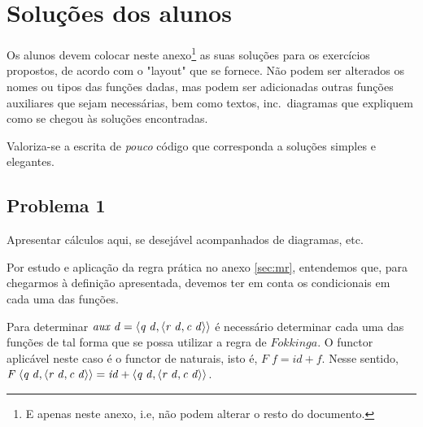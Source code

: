 \documentclass[a4paper]{article}
\newcommand{\Conid}[1]{\mathit{#1}}
\newcommand{\Varid}[1]{\mathit{#1}}
\begin{document}
\section{Soluções dos alunos}\label{sec:resolucao}

Os alunos devem colocar neste anexo\footnote{E apenas neste anexo,
i.e, não podem alterar o resto do documento.} as suas soluções para os
exercícios propostos, de acordo com o "layout" que se fornece. Não podem
ser alterados os nomes ou tipos das funções dadas, mas podem ser adicionadas
outras funções auxiliares que sejam necessárias, bem como 
textos, inc.\ diagramas que expliquem como se chegou às soluções encontradas.

Valoriza-se a escrita de \emph{pouco} código que corresponda a soluções
simples e elegantes.

\subsection*{Problema 1} \label{pg:P1}

Apresentar cálculos aqui, se desejável acompanhados de diagramas, etc.

Por estudo e aplicação da regra prática no anexo \ref{sec:mr}, entendemos que, 
para chegarmos à definição apresentada, devemos ter em conta os condicionais em cada uma das funções.

Para determinar \ensuremath{\Varid{aux}\;\Varid{d}\mathrel{=}\conj{\Varid{q}\;\Varid{d}}{\conj{\Varid{r}\;\Varid{d}}{\Varid{c}\;\Varid{d}}}} é necessário determinar cada uma das funções
de tal forma que se possa utilizar a regra de \ensuremath{\Conid{Fokkinga}}. O functor aplicável neste caso é o functor de naturais,
isto é, \ensuremath{\Conid{F}\;\Varid{f}\mathrel{=}\Varid{id}\mathbin{+}\Varid{f}}. Nesse sentido, \ensuremath{\Conid{F}\;\conj{\Varid{q}\;\Varid{d}}{\conj{\Varid{r}\;\Varid{d}}{\Varid{c}\;\Varid{d}}}\mathrel{=}\Varid{id}\mathbin{+}\conj{\Varid{q}\;\Varid{d}}{\conj{\Varid{r}\;\Varid{d}}{\Varid{c}\;\Varid{d}}}}.
\end{document}
